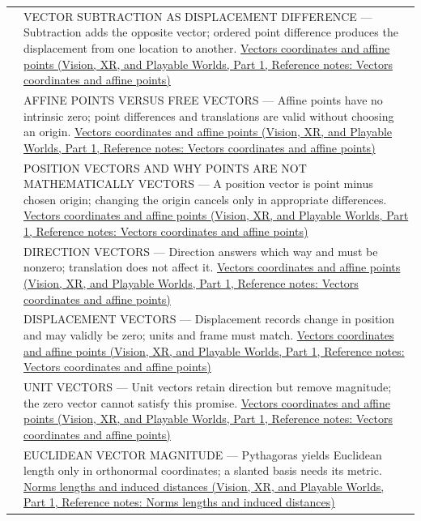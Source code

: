 {\begin{longtable}[]{@{}
  >{\raggedright\arraybackslash}p{}
  >{\raggedright\arraybackslash}p{}@{}}
520 & VECTOR SUBTRACTION AS DISPLACEMENT DIFFERENCE --- Subtraction adds the opposite vector; ordered point difference produces the displacement from one location to another. \href{../07-Vision-XR-and-Playable-Worlds-P01/main.pdf\#appendix-0659864c0aa3}{Vectors coordinates and affine points (Vision, XR, and Playable Worlds, Part 1, Reference notes: Vectors coordinates and affine points)} \\
521 & AFFINE POINTS VERSUS FREE VECTORS --- Affine points have no intrinsic zero; point differences and translations are valid without choosing an origin. \href{../07-Vision-XR-and-Playable-Worlds-P01/main.pdf\#appendix-0659864c0aa3}{Vectors coordinates and affine points (Vision, XR, and Playable Worlds, Part 1, Reference notes: Vectors coordinates and affine points)} \\
522 & POSITION VECTORS AND WHY POINTS ARE NOT MATHEMATICALLY VECTORS --- A position vector is point minus chosen origin; changing the origin cancels only in appropriate differences. \href{../07-Vision-XR-and-Playable-Worlds-P01/main.pdf\#appendix-0659864c0aa3}{Vectors coordinates and affine points (Vision, XR, and Playable Worlds, Part 1, Reference notes: Vectors coordinates and affine points)} \\
523 & DIRECTION VECTORS --- Direction answers which way and must be nonzero; translation does not affect it. \href{../07-Vision-XR-and-Playable-Worlds-P01/main.pdf\#appendix-0659864c0aa3}{Vectors coordinates and affine points (Vision, XR, and Playable Worlds, Part 1, Reference notes: Vectors coordinates and affine points)} \\
524 & DISPLACEMENT VECTORS --- Displacement records change in position and may validly be zero; units and frame must match. \href{../07-Vision-XR-and-Playable-Worlds-P01/main.pdf\#appendix-0659864c0aa3}{Vectors coordinates and affine points (Vision, XR, and Playable Worlds, Part 1, Reference notes: Vectors coordinates and affine points)} \\
525 & UNIT VECTORS --- Unit vectors retain direction but remove magnitude; the zero vector cannot satisfy this promise. \href{../07-Vision-XR-and-Playable-Worlds-P01/main.pdf\#appendix-0659864c0aa3}{Vectors coordinates and affine points (Vision, XR, and Playable Worlds, Part 1, Reference notes: Vectors coordinates and affine points)} \\
526 & EUCLIDEAN VECTOR MAGNITUDE --- Pythagoras yields Euclidean length only in orthonormal coordinates; a slanted basis needs its metric. \href{../07-Vision-XR-and-Playable-Worlds-P01/main.pdf\#appendix-49933872bb51}{Norms lengths and induced distances (Vision, XR, and Playable Worlds, Part 1, Reference notes: Norms lengths and induced distances)} \\

\end{longtable}}
